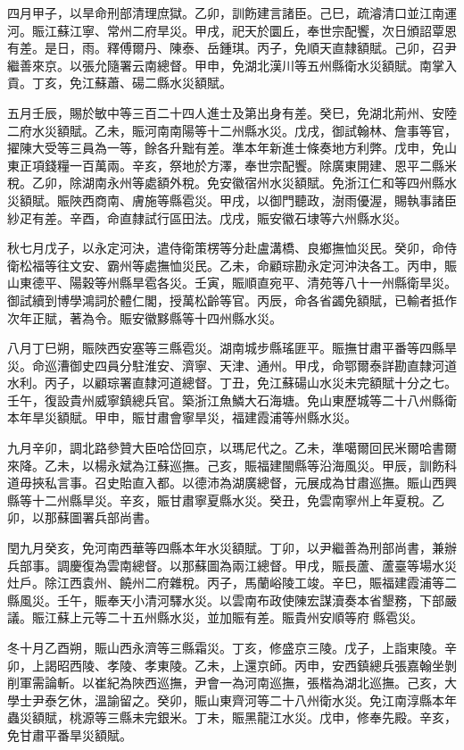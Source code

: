\begin{pinyinscope}
四月甲子，以旱命刑部清理庶獄。乙卯，訓飭建言諸臣。己巳，疏濬清口並江南運河。賑江蘇江寧、常州二府旱災。甲戌，祀天於圜丘，奉世宗配饗，次日頒詔覃恩有差。是日，雨。釋傅爾丹、陳泰、岳鍾琪。丙子，免順天直隸額賦。己卯，召尹繼善來京。以張允隨署云南總督。甲申，免湖北漢川等五州縣衛水災額賦。南掌入貢。丁亥，免江蘇蕭、碭二縣水災額賦。

五月壬辰，賜於敏中等三百二十四人進士及第出身有差。癸巳，免湖北荊州、安陸二府水災額賦。乙未，賑河南南陽等十二州縣水災。戊戌，御試翰林、詹事等官，擢陳大受等三員為一等，餘各升黜有差。準本年新進士條奏地方利弊。戊申，免山東正項錢糧一百萬兩。辛亥，祭地於方澤，奉世宗配饗。除廣東開建、恩平二縣米稅。乙卯，除湖南永州等處額外稅。免安徽宿州水災額賦。免浙江仁和等四州縣水災額賦。賑陜西商南、膚施等縣雹災。甲戌，以御門聽政，澍雨優渥，賜執事諸臣紗疋有差。辛酉，命直隸試行區田法。戊戌，賑安徽石埭等六州縣水災。

秋七月戊子，以永定河決，遣侍衛策楞等分赴盧溝橋、良鄉撫恤災民。癸卯，命侍衛松福等往文安、霸州等處撫恤災民。乙未，命顧琮勘永定河沖決各工。丙申，賑山東德平、陽穀等州縣旱雹各災。壬寅，賑順直宛平、清苑等八十一州縣衛旱災。御試續到博學鴻詞於體仁閣，授萬松齡等官。丙辰，命各省蠲免額賦，已輸者抵作次年正賦，著為令。賑安徽黟縣等十四州縣水災。

八月丁巳朔，賑陜西安塞等三縣雹災。湖南城步縣瑤匪平。賑撫甘肅平番等四縣旱災。命巡漕御史四員分駐淮安、濟寧、天津、通州。甲戌，命鄂爾泰詳勘直隸河道水利。丙子，以顧琮署直隸河道總督。丁丑，免江蘇碭山水災未完額賦十分之七。壬午，復設貴州威寧鎮總兵官。築浙江魚鱗大石海塘。免山東歷城等二十八州縣衛本年旱災額賦。甲申，賑甘肅會寧旱災，福建霞浦等州縣水災。

九月辛卯，調北路參贊大臣哈岱回京，以瑪尼代之。乙未，準噶爾回民米爾哈書爾來降。乙未，以楊永斌為江蘇巡撫。己亥，賑福建閩縣等沿海風災。甲辰，訓飭科道毋挾私言事。召史貽直入都。以德沛為湖廣總督，元展成為甘肅巡撫。賑山西興縣等十二州縣旱災。辛亥，賑甘肅寧夏縣水災。癸丑，免雲南寧州上年夏稅。乙卯，以那蘇圖署兵部尚書。

閏九月癸亥，免河南西華等四縣本年水災額賦。丁卯，以尹繼善為刑部尚書，兼辦兵部事。調慶復為雲南總督。以那蘇圖為兩江總督。甲戌，賑長蘆、蘆臺等場水災灶戶。除江西袁州、饒州二府雜稅。丙子，馬蘭峪陵工竣。辛巳，賑福建霞浦等二縣風災。壬午，賑奉天小清河驛水災。以雲南布政使陳宏謀瀆奏本省墾務，下部嚴議。賑江蘇上元等二十五州縣水災，並加賑有差。賑貴州安順等府縣雹災。

冬十月乙酉朔，賑山西永濟等三縣霜災。丁亥，修盛京三陵。戊子，上詣東陵。辛卯，上謁昭西陵、孝陵、孝東陵。乙未，上還京師。丙申，安西鎮總兵張嘉翰坐剝削軍需論斬。以崔紀為陜西巡撫，尹會一為河南巡撫，張楷為湖北巡撫。己亥，大學士尹泰乞休，溫諭留之。癸卯，賑山東齊河等二十八州衛水災。免江南淳縣本年蟲災額賦，桃源等三縣未完銀米。丁未，賑黑龍江水災。戊申，修奉先殿。辛亥，免甘肅平番旱災額賦。


\end{pinyinscope}
